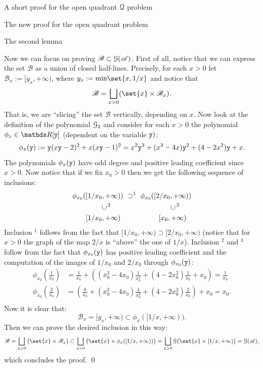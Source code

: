\documentclass[11pt, a4paper, english, twoside, notitlepage, openright]{report}
\begin{document}
\begin{chapter}{A short proof for the open quadrant $\mathcal{Q}$ problem}
\begin{section}{The new proof for the open quadrant problem}
\begin{subsection}{The second lemma}
\begin{lemma}
\begin{Proof}
Now we can focus on proving $\mathscr{B} \subset \mathcal{G}(\mathscr{A})$. First of all, notice that we can express the set $\mathscr{B}$ as a union of closed half-lines. Precisely, for each $x>0$ let $\mathscr{B}_x:=[y_x,+\infty)$, where $y_x:=\text{min}\set{x,1/x}$ and notice that
$$
\mathscr{B}=\bigsqcup_{x>0}(\set{x}\times\mathscr{B}_x).
$$
That is, we are ``slicing'' the set $\mathscr{B}$ vertically, depending on $x$. Now look at the definition of the polynomial $\mathcal{G}_2$ and consider for each $x>0$ the polynomial $\phi_x\in\R[{\tt y}]$ (dependent on the variable ${\tt y})$:
$$
\phi_x({\tt y}):={\tt y}(x{\tt y}-2)^2+x(x{\tt y}-1)^2=x^2{\tt y}^3+(x^3-4x){\tt y}^2+(4-2x^2){\tt y}+x.
$$
The polynomials $\phi_x({\tt y})$ have odd degree and positive leading coefficient since $x > 0$. Now notice that if we fix $x_0 > 0$ then we get the following sequence of inclusions:
\begin{equation*}
\begin{aligned}
\phi_{x_0}(&[1/x_0,+\infty))\ \supset ^1 \ \phi_{x_0}([2/x_0,+\infty))\\
&\quad \quad \ \rotatebox[origin=c]{90}{$\subset$}\,^2 \hspace{3cm} \rotatebox[origin=c]{90}{$\subset$}\,^3\\
&[1/x_0,+\infty) \hspace{1.9cm}[x_0, +\infty) \\
\end{aligned}
\end{equation*}
Inclusion $^1$ follows from the fact that $[1/x_0, +\infty) \supset [2/x_0, +\infty)$ (notice that for $x>0$ the graph of the map $2/x$ is ``above'' the one of $1/x$). Inclusion $^2$ and $^3$ follow from the fact that $\phi_{x_0}({\tt y})$ has positive leading coefficient and the computation of the images of $1/x_0$ and $2/x_0$ through $\phi_{x_0}({\tt y})$:
\begin{equation*}
\begin{aligned}
\phi_{x_0}\left(\frac{1}{x_0}\right)&=\frac{1}{x_0}+\left((x_0^3-4x_0)\frac{1}{x_0^2}+(4-2x_0^2)\frac{1}{x_0}+x_0\right)= \frac{1}{x_0}\\
\phi_{x_0}\left(\frac{2}{x_0}\right)&=\left(\frac{8}{x_0}+(x_0^3-4x_0)\frac{4}{x_0^2}+(4-2x_0^2)\frac{2}{x_0}\right)+x_0= x_0.\\
\end{aligned}
\end{equation*}
Now it is clear that:
$$
\mathscr{B}_x=[y_x,+\infty)\subset\phi_x([1/x, +\infty)).
$$
Then we can prove the desired inclusion in this way:
$$
\mathscr{B}=\bigsqcup_{x>0}\big(\set{x}\times\mathscr{B}_x\big)\subset\bigsqcup_{x>0}\big(\set{x}\times\phi_x([1/x,+\infty))\big)=\bigsqcup_{x>0}\GG\big(\set{x}\times[1/x,+\infty)\big)=\GG(\mathscr{A}),
$$
which concludes the proof.
\qed
\end{Proof}
\end{lemma}
\end{subsection}


\end{section}
\end{chapter}
\end{document}
